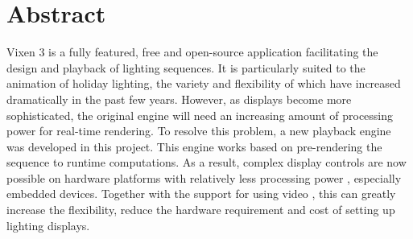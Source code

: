 \renewcommand{\baselinestretch}{1.5}
\chapter{Abstract}
\renewcommand{\baselinestretch}{\mystretch}


Vixen 3 is a fully featured, free and open-source application facilitating the design and playback of lighting sequences. It is particularly suited to the animation of holiday lighting, the variety and flexibility of which have increased dramatically in the past few years. However, as displays become more sophisticated, the original engine will need an increasing amount of processing power for real-time rendering. To resolve this problem, a new playback engine was developed in this project. This engine works based on pre-rendering the sequence to  runtime computations. As a result, complex display controls are now possible on hardware platforms with relatively less processing power , especially embedded devices. Together with the  support for using video , this can greatly increase the flexibility, reduce the hardware requirement and cost of setting up lighting displays. 
